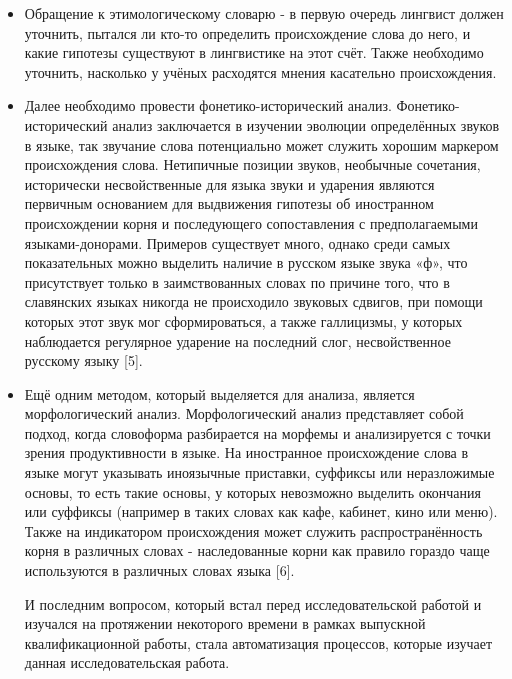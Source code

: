 \begin{itemize}
\item
  Обращение к этимологическому словарю - в первую очередь лингвист должен уточнить, пытался ли кто-то определить происхождение слова до него, и какие гипотезы существуют в лингвистике на этот счёт. Также необходимо уточнить, насколько у учёных расходятся мнения касательно происхождения.
\item
  Далее необходимо провести фонетико-исторический анализ. Фонетико-исторический анализ заключается в изучении эволюции определённых звуков в языке, так звучание слова потенциально может служить хорошим маркером происхождения слова. Нетипичные позиции звуков, необычные сочетания, исторически несвойственные для языка звуки и ударения являются первичным основанием для выдвижения гипотезы об иностранном происхождении корня и последующего сопоставления с предполагаемыми языками-донорами. Примеров существует много, однако среди самых показательных можно выделить наличие в русском языке звука «ф», что присутствует только в заимствованных словах по причине того, что в славянских языках никогда не происходило звуковых сдвигов, при помощи которых этот звук мог сформироваться, а также галлицизмы, у которых наблюдается регулярное ударение на последний слог, несвойственное русскому языку {[}5{]}.
\item
  Ещё одним методом, который выделяется для анализа, является морфологический анализ. Морфологический анализ представляет собой подход, когда словоформа разбирается на морфемы и анализируется с точки зрения продуктивности в языке. На иностранное происхождение слова в языке могут указывать иноязычные приставки, суффиксы или неразложимые основы, то есть такие основы, у которых невозможно выделить окончания или суффиксы (например в таких словах как \textquotesingle\textquotesingle кафе\textquotesingle\textquotesingle, \textquotesingle\textquotesingle кабинет\textquotesingle\textquotesingle, \textquotesingle\textquotesingle кино\textquotesingle\textquotesingle{} или \textquotesingle\textquotesingle меню\textquotesingle\textquotesingle). Также на индикатором происхождения может служить распространённость корня в различных словах - наследованные корни как правило гораздо чаще используются в различных словах языка {[}6{]}.

  И последним вопросом, который встал перед исследовательской работой и изучался на протяжении некоторого времени в рамках выпускной квалификационной работы, стала автоматизация процессов, которые изучает данная исследовательская работа.


\end{itemize}
